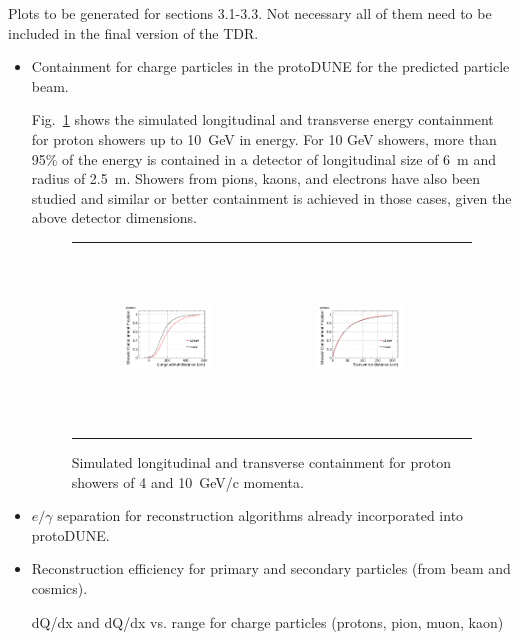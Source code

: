 Plots to be generated for  sections 3.1-3.3. Not necessary all of them need to be included in the final version of the TDR.
\begin{itemize}
\item Containment for charge particles in the protoDUNE for the predicted particle beam. 

Fig.~\ref{fig:containment} shows the simulated longitudinal and transverse 
energy containment for proton showers up to 10~GeV in energy.
For 10 GeV showers, more than 95\% of the energy is contained in a detector of longitudinal size of 6~m and 
radius of 2.5~m. Showers from pions, kaons, and electrons have also been studied and similar or better containment is achieved in those cases, given the above detector dimensions.
\begin{figure}[htp]
  \centering
  \begin{tabular}{ccc}
   \includegraphics[width=0.49\textwidth,height=4.9cm]{figures/protons_lcont_overlay}&
   \includegraphics[width=0.49\textwidth,height=4.9cm]{figures/protons_wcont_overlay}\\
  \end{tabular}
  \caption{Simulated longitudinal and transverse containment for proton showers of 4 and 10~GeV/c momenta.
}
  \label{fig:containment}  
\end{figure}


\item $e/\gamma$ separation for reconstruction algorithms already incorporated into protoDUNE.
\item Reconstruction efficiency for primary and secondary particles (from beam and cosmics).
\item [dQ/dx and dQ/dx vs. range for charge particles (protons, pion, muon, kaon)]


\end{itemize}
